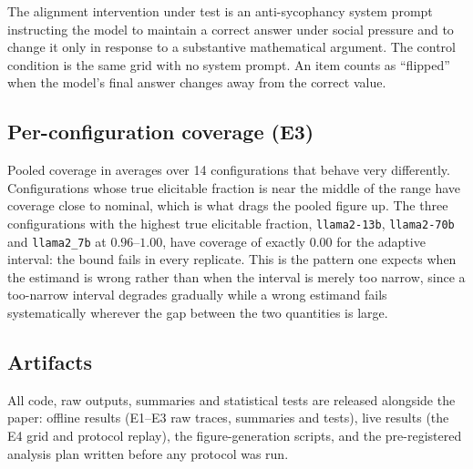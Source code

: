 The alignment intervention under test is an anti-sycophancy system prompt instructing the model to
maintain a correct answer under social pressure and to change it only in response to a substantive
mathematical argument. The control condition is the same grid with no system prompt. An item counts
as ``flipped'' when the model's final answer changes away from the correct value.

\subsection{Per-configuration coverage (E3)}
\label{app:coverage}

Pooled coverage in  averages over 14 configurations that behave very
differently. Configurations whose true elicitable fraction is near the middle of the range have
coverage close to nominal, which is what drags the pooled figure up. The three configurations with
the highest true elicitable fraction, \texttt{llama2-13b}, \texttt{llama2-70b} and
\texttt{llama2\_7b} at $0.96$--$1.00$, have coverage of exactly $0.00$ for the adaptive interval:
the bound fails in every replicate. This is the pattern one expects when the estimand is wrong
rather than when the interval is merely too narrow, since a too-narrow interval degrades gradually
while a wrong estimand fails systematically wherever the gap between the two quantities is large.

\subsection{Artifacts}
\label{app:artifacts}

All code, raw outputs, summaries and statistical tests are released alongside the paper:
offline results (E1--E3 raw traces, summaries and tests), live results (the E4 grid and protocol
replay), the figure-generation scripts, and the pre-registered analysis plan written before any
protocol was run.
